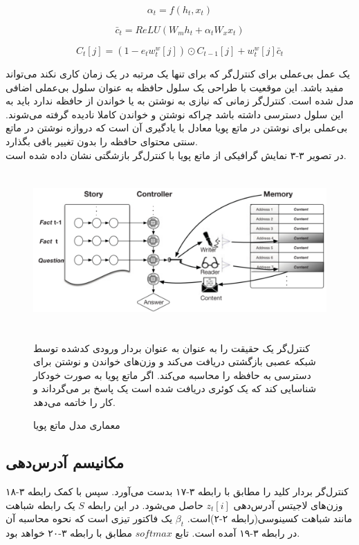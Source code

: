 \begin{equation}
\alpha_t = f(h_t, x_t)
\end{equation}

\begin{equation}
\bar{c}_t = ReLU(W_mh_t + \alpha_tW_xx_t)
\end{equation}

\begin{equation}
C_t[j] = (1-e_tw_t^w[j]) \odot C_{t-1}[j] + w_t^w[j]\bar{c}_t
\end{equation}

یک عمل بی‌عملی برای کنترل‌گر که برای تنها یک مرتبه در یک زمان کاری نکند می‌تواند مفید باشد. این موقعیت با طراحی یک سلول حافظه به عنوان سلول بی‌عملی اضافی مدل شده است. کنترل‌گر زمانی که نیازی به نوشتن به یا خواندن از حافظه ندارد باید به این سلول دسترسی داشته باشد چراکه نوشتن و خواندن کاملا نادیده گرفته می‌شوند. بی‌عملی برای نوشتن در ماتع پویا معادل با یادگیری آن است که دروازه نوشتن در ماتع سنتی محتوای حافظه را بدون تغییر باقی بگذارد.\cite{gulcehre2018dynamic}
\\

در تصویر ۳-۳ نمایش گرافیکی از ماتع پویا با کنترل‌گر بازشگتی نشان داده شده است.

\begin{figure}[!h]
\begin{center}
\includegraphics[height=6cm]{DNTM.png}
\end{center}
\caption{معماری مدل ماتع پویا\cite{gulcehre2018dynamic}}
\medskip
\small
کنترل‌گر یک حقیقت را به عنوان به عنوان بردار ورودی کدشده توسط شبکه عصبی بازگشتی دریافت می‌کند و وزن‌های خواندن و نوشتن برای دسترسی به حافظه را محاسبه می‌کند. اگر ماتع پویا به صورت خودکار شناسایی کند که یک کوئری دریافت شده است یک پاسخ بر می‌گرداند و کار را خاتمه می‌دهد.\cite{gulcehre2018dynamic}
\end{figure}

\subsection{مکانیسم آدرس‌دهی}
کنترل‌گر بردار کلید را مطابق با رابطه ۳-۱۷ بدست می‌آورد. سپس با کمک رابطه ۳-۱۸ وزن‌های لاجیتس آدرس‌دهی $z_t[i]$ حاصل می‌شود. در این رابطه $S$‌ یک رابطه شباهت مانند شباهت کسینوسی(رابطه ۲-۲)است. $\beta_t$ یک فاکتور تیزی است که نحوه محاسبه آن در رابطه ۳-۱۹ آمده است. تابع $softmax$ مطابق با رابطه ۳-۲۰ خواهد بود.\cite{gulcehre2018dynamic} 


